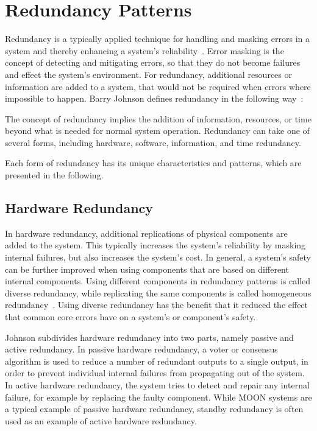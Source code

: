 \section{Redundancy Patterns}
\label{sec:redundancyPatterns}
Redundancy is a typically applied technique for handling and masking errors in a system and thereby enhancing a system's reliability~\cite{TanenbaumSteen07}.
Error masking is the concept of detecting and mitigating errors, so that they do not become failures and effect the system's environment.
For redundancy, additional resources or information are added to a system, that would not be required when errors where impossible to happen.
Barry Johnson defines redundancy in the following way~\cite{BarryFaultToleranceAnalysis}:
\begin{definition}
The concept of redundancy implies the addition of information, resources, or time beyond what is needed for normal system operation.
Redundancy can take one of several forms, including hardware, software, information, and time redundancy.
\end{definition}

Each form of redundancy has its unique characteristics and patterns, which are presented in the following.

\subsection{Hardware Redundancy}
In hardware redundancy, additional replications of physical components are added to the system.
This typically increases the system's reliability by masking internal failures, but also increases the system's cost.
In general, a system's safety can be further improved when using components that are based on different internal components.
Using different components in redundancy patterns is called diverse redundancy, while replicating the same components is called homogeneous redundancy~\cite{HomogeneousRedundancyOuzineb}.
Using diverse redundancy has the benefit that it reduced the effect that common core errors have on a system's or component's safety.

Johnson subdivides hardware redundancy into two parts, namely passive and active redundancy.
In passive hardware redundancy, a voter or consensus algorithm is used to reduce a number of redundant outputs to a single output, in order to prevent individual internal failures from propagating out of the system.
In active hardware redundancy, the system tries to detect and repair any internal failure, for example by replacing the faulty component.
While \gls*{MOON} systems are a typical example of passive hardware redundancy, standby redundancy is often used as an example of active hardware redundancy.


